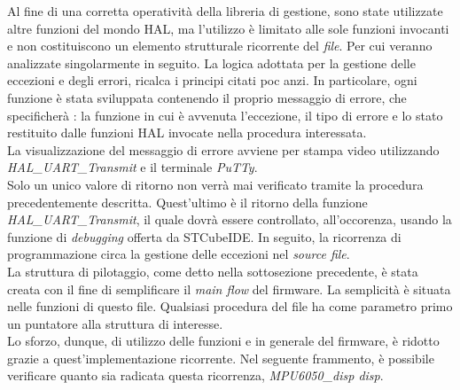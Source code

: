 \documentclass[11pt]{report}
\begin{document}
Al fine di una corretta operatività della libreria di gestione, sono state utilizzate altre funzioni del mondo HAL, ma l'utilizzo è limitato alle sole funzioni invocanti e non costituiscono un elemento strutturale ricorrente del \textit{file}.
Per cui veranno analizzate singolarmente in seguito.
La logica adottata per la gestione delle eccezioni e degli errori, ricalca i principi citati poc anzi. In particolare, ogni funzione è stata sviluppata contenendo il proprio messaggio di errore, che specificherà : la funzione in cui è avvenuta l'eccezione, il tipo di errore e lo stato restituito dalle funzioni HAL invocate nella procedura interessata.\\
La visualizzazione del messaggio di errore avviene per stampa video utilizzando\\\textit{HAL\_UART\_Transmit} e il terminale \textit{PuTTy}.\\
Solo un unico valore di ritorno non verrà mai verificato tramite la procedura precedentemente descritta. Quest'ultimo è il ritorno della funzione \textit{HAL\_UART\_Transmit}, il quale dovrà essere controllato, all'occorenza, usando la funzione di \textit{debugging} offerta da STCubeIDE.
In seguito, la ricorrenza di programmazione circa la gestione delle eccezioni nel \textit{source file}.\\

La struttura di pilotaggio, come detto nella sottosezione precedente, è stata creata con il fine di semplificare il \textit{main flow} del firmware. La semplicità è situata nelle funzioni di questo file. Qualsiasi procedura del file ha come parametro primo un puntatore alla struttura di interesse.\\
Lo sforzo, dunque, di utilizzo delle funzioni e in generale del firmware, è ridotto grazie a quest'implementazione ricorrente.
Nel seguente frammento, è possibile verificare quanto sia radicata questa ricorrenza, \textit{MPU6050\_disp disp}.

\end{document}
